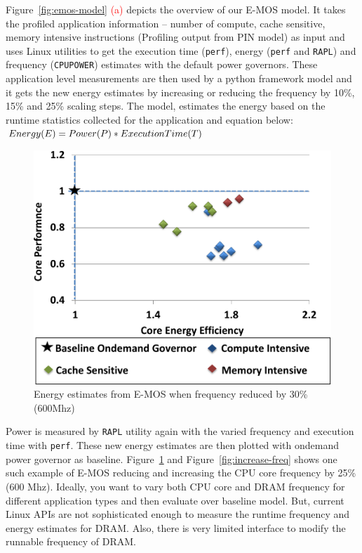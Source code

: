Figure~\ref{fig:emos-model} \textcolor{red}{(a)} depicts the overview
of our E-MOS model. It takes the profiled application information -- number of 
compute, cache sensitive, memory intensive instructions (Profiling output from PIN model) as input 
and uses Linux utilities to get the execution time (\texttt{perf}), energy (\texttt{perf} and \texttt{RAPL}) and 
frequency (\texttt{CPUPOWER}) estimates with the
default power governors. These application level measurements are then used 
by a python framework model and it gets the new energy estimates
by increasing or reducing the frequency by 10\%, 15\% and 25\% scaling steps.
The model, estimates the energy based on the runtime statistics collected for the application and equation below:
\newline
\newline
\begin{math}
\centering
{Energy (E) = Power (P) * Execution Time (T)}
\end{math}
\newline

\begin{figure}[h]
  \begin{center}
\includegraphics[width=\linewidth]{figs/ana-reduce-crop.pdf}
  \end{center}
  \vspace{-0.1in}
  \caption{Energy estimates from E-MOS when frequency reduced by 30\% (600Mhz)}
	\label{fig:reduce-freq}
\end{figure}

Power is measured by \texttt{RAPL} utility again with the varied frequency 
and execution time with \texttt{perf}. These new energy estimates are then plotted
with ondemand power governor as baseline. 
Figure~\ref{fig:reduce-freq} and Figure~\ref{fig:increase-freq}
shows one such example of E-MOS reducing and increasing the CPU core frequency by 25\% (600 Mhz).
Ideally, you want to vary both CPU core and DRAM frequency for different application types
and then evaluate over baseline model. But, current Linux APIs are not sophisticated
enough to measure the runtime frequency and energy estimates for DRAM. Also, there is very limited
interface to modify the runnable frequency of DRAM.


